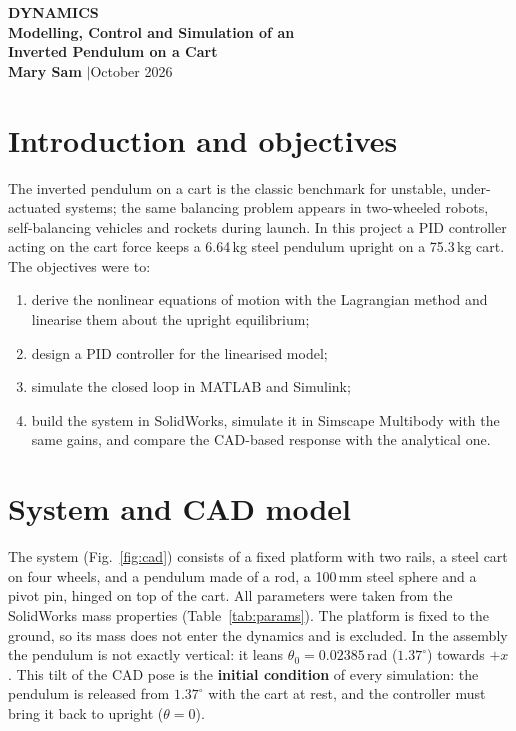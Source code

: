 \documentclass[10pt,a4paper]{article}
\newcommand{\studentname}{Mary Sam}
\newcommand{\coursename}{Dynamics}
\newcommand{\reportdate}{October 2026}
\begin{document}
\thispagestyle{fancy}
\begin{center}
{\Large\bfseries\color{navy}\MakeUppercase{\coursename}}\\[4pt]
{\LARGE\bfseries\color{navy} Modelling, Control and Simulation of an\\[2pt] Inverted Pendulum on a Cart}\\[6pt]
{\normalsize\textbf{\studentname} \quad$|$\quad \reportdate}
\end{center}
\vspace{-2pt}

\section{Introduction and objectives}
The inverted pendulum on a cart is the classic benchmark for unstable, under-actuated systems; the same
balancing problem appears in two-wheeled robots, self-balancing vehicles and rockets during launch.
In this project a PID controller acting on the cart force keeps a 6.64\,kg steel pendulum upright on a
75.3\,kg cart. The objectives were to:
\begin{enumerate}
  \item derive the nonlinear equations of motion with the Lagrangian method and linearise them about the
        upright equilibrium;
  \item design a PID controller for the linearised model;
  \item simulate the closed loop in MATLAB and Simulink;
  \item build the system in SolidWorks, simulate it in Simscape Multibody with the same gains, and compare
        the CAD-based response with the analytical one.
\end{enumerate}

\section{System and CAD model}
The system (Fig.~\ref{fig:cad}) consists of a fixed platform with two rails, a steel cart on four wheels,
and a pendulum made of a rod, a 100\,mm steel sphere and a pivot pin, hinged on top of the cart. All
parameters were taken from the SolidWorks mass properties (Table~\ref{tab:params}). The platform is fixed
to the ground, so its mass does not enter the dynamics and is excluded. In the assembly the pendulum is
not exactly vertical: it leans $\theta_0 = 0.02385$\,rad ($1.37^\circ$) towards $+x$. This tilt of the CAD pose
is the \textbf{initial condition} of every simulation: the pendulum is released from $1.37^\circ$ with the cart
at rest, and the controller must bring it back to upright ($\theta = 0$).
\end{document}
